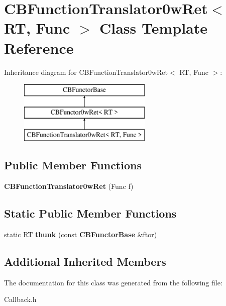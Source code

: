 \section{C\+B\+Function\+Translator0w\+Ret$<$ RT, Func $>$ Class Template Reference}
\label{classCBFunctionTranslator0wRet}
Inheritance diagram for C\+B\+Function\+Translator0w\+Ret$<$ RT, Func $>$\+:\begin{figure}[H]
\begin{center}
\leavevmode
\includegraphics[height=3.000000cm]{classCBFunctionTranslator0wRet}
\end{center}
\end{figure}
\subsection*{Public Member Functions}
\begin{DoxyCompactItemize}
\item 
{\bfseries C\+B\+Function\+Translator0w\+Ret} (Func f)\label{classCBFunctionTranslator0wRet_a47476a9784c6b5ee86181c17c3846a5b}

\end{DoxyCompactItemize}
\subsection*{Static Public Member Functions}
\begin{DoxyCompactItemize}
\item 
static RT {\bfseries thunk} (const {\bf C\+B\+Functor\+Base} \&ftor)\label{classCBFunctionTranslator0wRet_a212480259869fd827e7159e6f986b909}

\end{DoxyCompactItemize}
\subsection*{Additional Inherited Members}


The documentation for this class was generated from the following file\+:\begin{DoxyCompactItemize}
\item 
Callback.\+h\end{DoxyCompactItemize}
